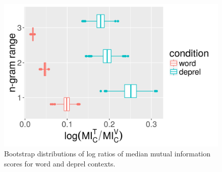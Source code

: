 \begin{figure}
  \centering
  \includegraphics[scale=0.5]{mi-stat/bootstrappedMI.png}
  \caption{Bootstrap distributions of log ratios of median mutual information scores for word and deprel contexts.}
  \label{fig:mi-boot}
  \vspace{-.2cm}
\end{figure}






